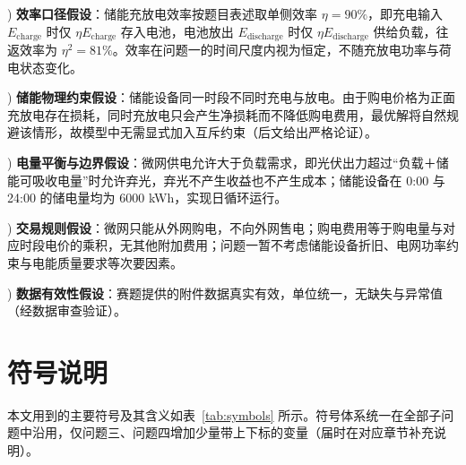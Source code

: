 \documentclass[zihao=-4,a4paper,UTF8,fontset=none]{ctexart}
\begin{document}
) \textbf{效率口径假设}：储能充放电效率按题目表述取单侧效率 $\eta = 90\%$，即充电输入 $E_{\mathrm{charge}}$ 时仅 $\eta E_{\mathrm{charge}}$ 存入电池，电池放出 $E_{\mathrm{discharge}}$ 时仅 $\eta E_{\mathrm{discharge}}$ 供给负载，往返效率为 $\eta^2 = 81\%$。效率在问题一的时间尺度内视为恒定，不随充放电功率与荷电状态变化。

) \textbf{储能物理约束假设}：储能设备同一时段不同时充电与放电。由于购电价格为正面充放电存在损耗，同时充放电只会产生净损耗而不降低购电费用，最优解将自然规避该情形，故模型中无需显式加入互斥约束（后文给出严格论证）。

) \textbf{电量平衡与边界假设}：微网供电允许大于负载需求，即光伏出力超过“负载＋储能可吸收电量”时允许弃光，弃光不产生收益也不产生成本；储能设备在 0:00 与 24:00 的储电量均为 $6000$ kWh，实现日循环运行。

) \textbf{交易规则假设}：微网只能从外网购电，不向外网售电；购电费用等于购电量与对应时段电价的乘积，无其他附加费用；问题一暂不考虑储能设备折旧、电网功率约束与电能质量要求等次要因素。

) \textbf{数据有效性假设}：赛题提供的附件数据真实有效，单位统一，无缺失与异常值（经数据审查验证）。

\section{符号说明}

本文用到的主要符号及其含义如表~\ref{tab:symbols} 所示。符号体系统一在全部子问题中沿用，仅问题三、问题四增加少量带上下标的变量（届时在对应章节补充说明）。
\end{document}
